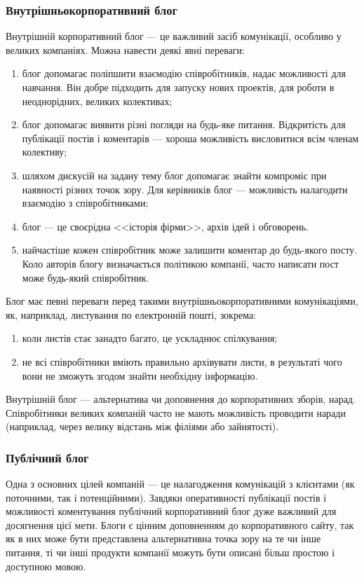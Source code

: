 \subsubsection{Внутрішньокорпоративний блог}
Внутрішній корпоративний блог --- це важливий засіб комунікації, особливо у великих компаніях. 
Можна навести деякі явні переваги:
\begin{enumerate}
\item блог допомагає поліпшити взаємодію співробітників, надає можливості для навчання. Він добре підходить для запуску нових проектів, для роботи в неоднорідних, великих колективах;
\item блог допомагає виявити різні погляди на будь-яке питання. Відкритість для публікації постів і коментарів --- хороша можливість висловитися всім членам колективу;
\item шляхом дискусій на задану тему блог допомагає знайти компроміс при наявності різних точок зору.
Для керівників блог --- можливість налагодити взаємодію з співробітниками;
\item блог --- це своєрідна <<історія фірми>>, архів ідей і обговорень.
\item найчастіше кожен співробітник може залишити коментар до будь-якого посту. Коло авторів блогу визначається політикою компанії, часто написати пост може будь-який співробітник.
\end{enumerate}


Блог має певні переваги перед такими внутрішньокорпоративними комунікаціями, як, наприклад, листування по електронній пошті, зокрема:

\begin{enumerate}
\item коли листів стає занадто багато, це ускладнює спілкування;
\item не всі співробітники вміють правильно архівувати листи, в результаті чого вони не зможуть згодом знайти необхідну інформацію.
\end{enumerate}

Внутрішній блог --- альтернатива чи доповнення до корпоративних зборів, нарад. 
Співробітники великих компаній часто не мають можливість проводити наради (наприклад, через велику відстань між філіями або зайнятості).

\subsubsection{Публічний блог}
Одна з основних цілей компаній --- це налагодження комунікацій з клієнтами (як поточними, так і потенційними).
Завдяки оперативності публікації постів і можливості коментування публічний корпоративний блог дуже важливий для досягнення цієї мети.
Блоги є цінним доповненням до корпоративного сайту, так як в них може бути представлена альтернативна точка зору на те чи інше питання, ті чи інші продукти компанії можуть бути описані більш простою і доступною мовою.



